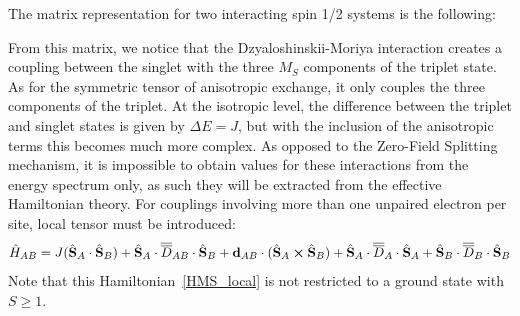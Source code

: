 \documentclass[12pt,a4paper]{report}
\numberwithin{equation}{section}
\begin{document}
The matrix representation for two interacting spin 1/2 systems is the following:
\begin{center}
    \centering
\end{center}
From this matrix, we notice that the Dzyaloshinskii-Moriya interaction creates a coupling between the singlet with the three $M_S$ components of the triplet state.
As for the symmetric tensor of anisotropic exchange, it only couples the three components of the triplet.
At the isotropic level, the difference between the triplet and singlet states is given by $\Delta E=J$, but with the inclusion of the anisotropic terms this becomes much more complex. 
As opposed to the Zero-Field Splitting mechanism, it is impossible to obtain values for these interactions from the energy spectrum only, as such they will be extracted from the effective Hamiltonian theory.
For couplings involving more than one unpaired electron per site, local tensor must be introduced:
\begin{equation}\label{HMS_local}
    \hat{H}_{AB}=J(\hat{\vb S}_A \cdot \hat{\vb S}_B) + \hat{\vb S}_A \cdot\overline{\overline{D}}_{AB} \cdot \hat{\vb S}_B + \vb{d}_{AB} \cdot (\hat{\vb S}_A \cross \hat{\vb S}_B) +\hat{\vb S}_A \cdot\overline{\overline{D}}_{A} \cdot \hat{\vb S}_A +\hat{\vb S}_B \cdot\overline{\overline{D}}_{B} \cdot \hat{\vb S}_B
\end{equation}
Note that this Hamiltonian~\ref{HMS_local} is not restricted to a ground state with $S\ge1$.
\end{document}
